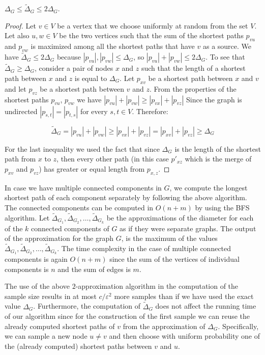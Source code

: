 \begin{lemma}\label{lem:diam}
  $\Delta_G\le\tilde\Delta_G\le 2\Delta_G$.
\end{lemma}
\begin{proof}
  Let $v\in V$ be a vertex that we choose uniformly at random from the set $V$.
  Let also $u,w\in V$ be the two vertices such that the sum of the shortest paths $p_{vu}$ and $p_{vw}$ is maximized among all the shortest paths that have $v$ as a source.
  We have $\tilde\Delta_G\le 2\Delta_G$ because
  $|p_{vu}|,|p_{vw}|\le\Delta_G$, so $|p_{vu}|+|p_{vw}|\le 2\Delta_G$. To see
  that $\tilde\Delta_G\ge\Delta_G$, consider a pair of nodes $x$ and $z$ such
  that the length of a shortest path between $x$ and $z$ is equal to $\Delta_G$.
  Let $p_{xv}$ be a shortest path between $x$ and $v$ and let $p_{vz}$ be a
  shortest path between $v$ and $z$. 
  From the properties of the shortest paths $p_{vu}$, $p_{vw}$ we have $|p_{vu}|+|p_{vw}|\geq |p_{vx}|+|p_{vz}|$
  Since the graph is undirected $|p_{s,t}|=|p_{t,s}|$ for every $s,t\in V$.
  Therefore:
  
  \begin{displaymath}
    \tilde\Delta_G = |p_{vu}|+|p_{vw}|\geq |p_{vx}|+|p_{vz}| = |p_{xv}|+|p_{vz}|\ge\Delta_G
  \end{displaymath}
   
  For the last inequality we used the fact that since $\Delta_G$ is the length of the shortest path from $x$ to $z$, then every other path (in this case $p'_{xz}$ which is the merge of $p_{xv}$ and $p_{vz}$) has greater or equal length from $p_{x,z}$.
\end{proof}

In case we have multiple connected components in $G$, we compute the longest shortest path of each component separately by following the above algorithm.
The connected components can be computed in $O(n+m)$ by using the BFS algorithm.
Let $\tilde\Delta_{G_{1}},\tilde\Delta_{G_{2}}, \ldots , \tilde\Delta_{G_{k}}$ be the approximations of the diameter for each of the $k$ connected components of $G$ as if they were separate graphs.
The output of the approximation for the graph $G$, is the maximum of the values $\tilde\Delta_{G_{1}},\tilde\Delta_{G_{2}}, \ldots , \tilde\Delta_{G_{k}}$.
The time complexity in the case of multiple connected components is again $O(n+m)$ since the sum of the vertices of individual components is $n$ and the sum of edges is $m$. 


The use of the above $2$-approximation algorithm in the computation of the sample size results in at most $c/\varepsilon^2$ more samples than if we have used the exact value $\Delta_G$. 
Furthermore, the computation of $\tilde\Delta_G$ does not affect the running time of our algorithm since for the construction of the first sample we can reuse the already computed shortest paths of $v$ from the approximation of $\Delta_G$.
Specifically, we can sample a new node $u\neq v$ and then choose with uniform probability one of the
(already computed) shortest paths between $v$ and $u$.

